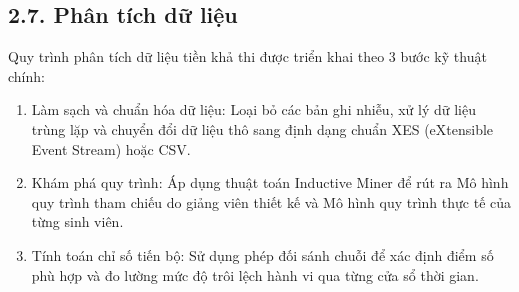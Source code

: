 \subsection{2.7. Phân tích dữ liệu}
Quy trình phân tích dữ liệu tiền khả thi được triển khai theo 3 bước kỹ thuật chính:
\begin{enumerate}
    \item Làm sạch và chuẩn hóa dữ liệu: Loại bỏ các bản ghi nhiễu, xử lý dữ liệu trùng lặp và chuyển đổi dữ liệu thô sang định dạng chuẩn XES (eXtensible Event Stream) hoặc CSV.
    \item Khám phá quy trình: Áp dụng thuật toán Inductive Miner để rút ra Mô hình quy trình tham chiếu do giảng viên thiết kế và Mô hình quy trình thực tế của từng sinh viên.
    \item Tính toán chỉ số tiến bộ: Sử dụng phép đối sánh chuỗi để xác định điểm số phù hợp và đo lường mức độ trôi lệch hành vi qua từng cửa sổ thời gian.
\end{enumerate}

